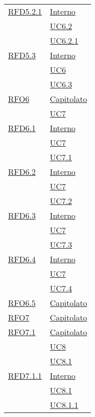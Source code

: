 \begin{longtable}{|>{\centering}m{5cm}|m{5cm}<{\centering}|}
\hyperlink{RFD5.2.1}{RFD5.2.1} & \hyperlink{Interno}{Interno}\\
& \hyperref[UC6.2]{UC6.2}\\
& \hyperref[UC6.2.1]{UC6.2.1}\\ \hline

\hyperlink{RFD5.3}{RFD5.3} & \hyperlink{Interno}{Interno}\\
& \hyperref[UC6]{UC6}\\
& \hyperref[UC6.3]{UC6.3}\\ \hline

\hyperlink{RFO6}{RFO6} & \hyperlink{Capitolato}{Capitolato}\\
& \hyperref[UC7]{UC7}\\ \hline

\hyperlink{RFD6.1}{RFD6.1} & \hyperlink{Interno}{Interno}\\
& \hyperref[UC7]{UC7}\\
& \hyperref[UC7.1]{UC7.1}\\ \hline

\hyperlink{RFD6.2}{RFD6.2} & \hyperlink{Interno}{Interno}\\
& \hyperref[UC7]{UC7}\\
& \hyperref[UC7.2]{UC7.2}\\ \hline

\hyperlink{RFD6.3}{RFD6.3} & \hyperlink{Interno}{Interno}\\
& \hyperref[UC7]{UC7}\\
& \hyperref[UC7.3]{UC7.3}\\ \hline

\hyperlink{RFD6.4}{RFD6.4} & \hyperlink{Interno}{Interno}\\
& \hyperref[UC7]{UC7}\\
& \hyperref[UC7.4]{UC7.4}\\ \hline

\hyperlink{RFO6.5}{RFO6.5} & \hyperlink{Capitolato}{Capitolato}\\ \hline

\hyperlink{RFO7}{RFO7} & \hyperlink{Capitolato}{Capitolato}\\ \hline

\hyperlink{RFO7.1}{RFO7.1} & \hyperlink{Capitolato}{Capitolato}\\
& \hyperref[UC8]{UC8}\\
& \hyperref[UC8.1]{UC8.1}\\ \hline

\hyperlink{RFD7.1.1}{RFD7.1.1} & \hyperlink{Interno}{Interno}\\
& \hyperref[UC8.1]{UC8.1}\\
& \hyperref[UC8.1.1]{UC8.1.1}\\ \hline


\end{longtable}
